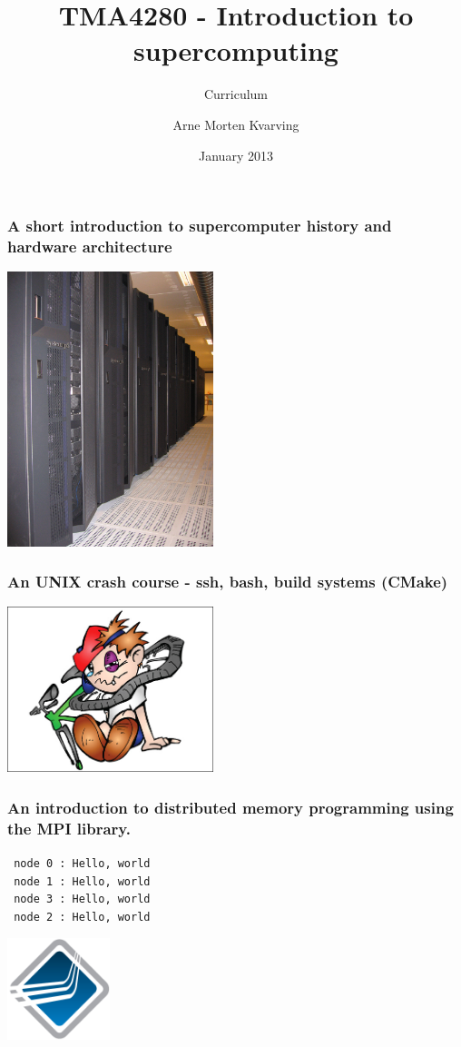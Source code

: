 \documentclass{beamer}
\title{TMA4280 - Introduction to supercomputing}
\subtitle{Curriculum}
\author{Arne Morten Kvarving}
\institute{SINTEF ICT}
\date{January 2013}
\begin{document}
\maketitle
\begin{frame}\frametitle{A short introduction to supercomputer history and
                         hardware architecture}
\begin{center}
\includegraphics[width=6cm]{njord_1}
\end{center}
\end{frame}
\begin{frame}\frametitle{An UNIX crash course - ssh, bash, build systems (CMake)}
\begin{center}
\includegraphics[width=6cm]{crash}
\end{center}
\end{frame}
\begin{frame}\frametitle{An introduction to distributed memory programming
                         using the MPI library.}
\begin{center}
\texttt{  node 0 :   Hello, world}\\
\texttt{  node 1 :   Hello, world}\\
\texttt{  node 3 :   Hello, world}\\
\texttt{  node 2 :   Hello, world}
\end{center}
\begin{center}
\includegraphics[width=3cm]{open-mpi-logo}
\end{center}
\end{frame}
\end{document}
